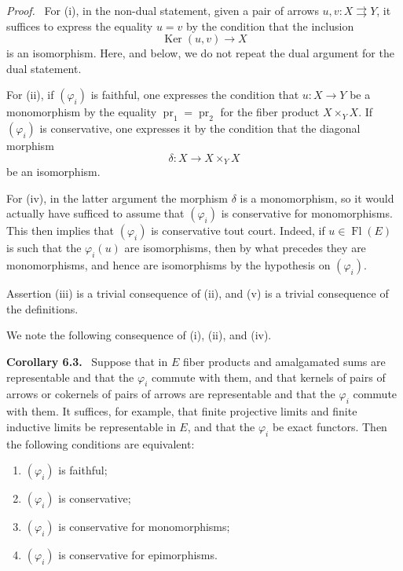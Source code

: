 \documentclass[11pt]{article}
\newcommand{\Ker}{\operatorname{Ker}}
\newcommand{\pr}{\operatorname{pr}}
\newcommand{\Fl}{\operatorname{Fl}}
\newenvironment{statement}[1]{\par\medskip\noindent\textbf{#1.}\ }{\par\medskip}
\newenvironment{proofsketch}{\par\noindent\emph{Proof.}\ }{\par\medskip}
\begin{document}
\begin{proofsketch}
For (i), in the non-dual statement, given a pair of arrows $u,v:X\rightrightarrows Y$, it suffices to express the equality $u=v$ by the condition that the inclusion
\[
\Ker(u,v)\longrightarrow X
\]
is an isomorphism. Here, and below, we do not repeat the dual argument for the dual statement.

For (ii), if $(\varphi_i)$ is faithful, one expresses the condition that $u:X\to Y$ be a monomorphism by the equality $\pr_1=\pr_2$ for the fiber product $X\times_YX$. If $(\varphi_i)$ is conservative, one expresses it by the condition that the diagonal morphism
\[
\delta:X\longrightarrow X\times_YX
\]
be an isomorphism.

For (iv), in the latter argument the morphism $\delta$ is a monomorphism, so it would actually have sufficed to assume that $(\varphi_i)$ is conservative for monomorphisms. This then implies that $(\varphi_i)$ is conservative tout court. Indeed, if $u\in\Fl(E)$ is such that the $\varphi_i(u)$ are isomorphisms, then by what precedes they are monomorphisms, and hence are isomorphisms by the hypothesis on $(\varphi_i)$.

Assertion (iii) is a trivial consequence of (ii), and (v) is a trivial consequence of the definitions.
\end{proofsketch}

We note the following consequence of (i), (ii), and (iv).

\begin{statement}{Corollary 6.3}
Suppose that in $E$ fiber products and amalgamated sums are representable and that the $\varphi_i$ commute with them, and that kernels of pairs of arrows or cokernels of pairs of arrows are representable and that the $\varphi_i$ commute with them. It suffices, for example, that finite projective limits and finite inductive limits be representable in $E$, and that the $\varphi_i$ be exact functors. Then the following conditions are equivalent:
\begin{enumerate}[label=\alph*)]
\item $(\varphi_i)$ is faithful;
\item $(\varphi_i)$ is conservative;
\item $(\varphi_i)$ is conservative for monomorphisms;
\item[(c')] $(\varphi_i)$ is conservative for epimorphisms.
\end{enumerate}
\end{statement}
\end{document}
